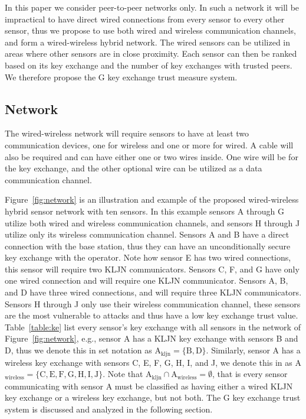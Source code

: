 \documentclass{ws-fnl2}
\begin{document}
In this paper we consider peer-to-peer networks only. In such a network it will be impractical to have direct wired connections from every sensor to every other sensor, thus we propose to use both wired and wireless communication channels, and form a wired-wireless hybrid network. The wired sensors can be utilized in areas where other sensors are in close proximity. Each sensor can then be ranked based on its key exchange and the number of key exchanges with trusted peers. We therefore propose the G key exchange trust measure system. 


\subsection{Network}

The wired-wireless network will require sensors to have at least two communication devices, one for wireless and one or more for wired. A cable will also be required and can have either one or two wires inside. One wire will be for the key exchange, and the other optional wire can be utilized as a data communication channel. 

Figure~\ref{fig:network} is an illustration and example of the proposed wired-wireless hybrid sensor network with ten sensors. In this example sensors A through G utilize both wired and wireless communication channels, and sensors H through J utilize only its wireless communication channel. Sensors A and B have a direct connection with the base station, thus they can have an unconditionally secure key exchange with the operator. Note how sensor E has two wired connections, this sensor will require two KLJN communicators. Sensors C, F, and G have only one wired connection and will require one KLJN communicator. Sensors A, B, and D have three wired connections, and will require three KLJN communicators. Sensors H through J only use their wireless communication channel, these sensors are the most vulnerable to attacks and thus have a low key exchange trust value. Table~\ref{table:ke} list every sensor's key exchange with all sensors in the network of Figure~\ref{fig:network}, e.g., sensor A has a KLJN key exchange with sensors B and D, thus we denote this in set notation as $\mathrm{A}_{\mathrm{kljn}}=\{\mathrm{B},\mathrm{D}\}$. Similarly, sensor A has a wireless key exchange with sensors C, E, F, G, H, I, and J, we denote this in as A$_\mathrm{wireless}=\{\mathrm{C},\mathrm{E},\mathrm{F},\mathrm{G},\mathrm{H},\mathrm{I},\mathrm{J}\}$. Note that $\mathrm{A}_{\mathrm{kljn}} \cap \mathrm{A}_{\mathrm{wireless}} = \emptyset$, that is every sensor communicating with sensor A must be classified as having either a wired KLJN key exchange or a wireless key exchange, but not both. The G key exchange trust system is discussed and analyzed in the following section.
\end{document}
